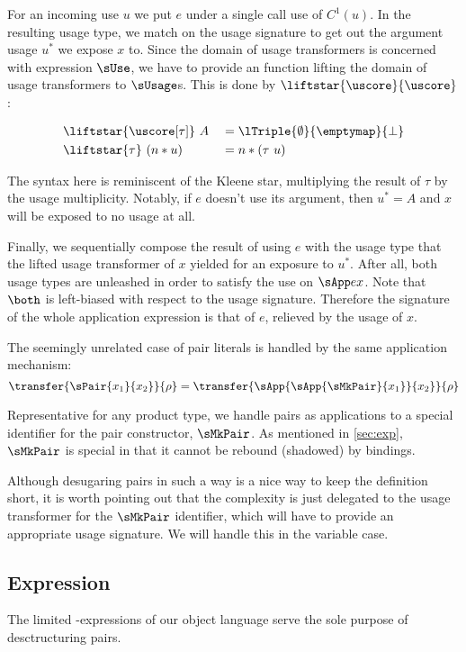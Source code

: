 For an incoming use $u$ we put $e$ under a single call use of $C^1(u)$. 
In the resulting usage type, we match on the usage signature to get out the argument usage $u^*$ we expose $x$ to.
Since the domain of usage transformers is concerned with expression $\sUse$, we have to provide an function lifting the domain of usage transformers to $\sUsage$s.
This is done by $\liftstar{\uscore}{\uscore}$:

\begin{alignat*}{2}
&\liftstar{\uscore[\tau]}~A &{}={}& \lTriple{\emptyset}{\emptymap}{\bot} \\
&\liftstar{\tau}~(n*u)      &{}={}& n*(\tau~u)
\end{alignat*}

The syntax here is reminiscent of the Kleene star, multiplying the result of $\tau$ by the usage multiplicity. Notably, if $e$ doesn't use its argument, then $u^*=A$ and $x$ will be exposed to no usage at all.

Finally, we sequentially compose the result of using $e$ with the usage type that the lifted usage transformer of $x$ yielded for an exposure to $u^*$. 
After all, both usage types are unleashed in order to satisfy the use on $\sApp e x$.
Note that $\both$ is left-biased with respect to the usage signature.
Therefore the signature of the whole application expression is that of $e$, relieved by the usage of $x$. 

The seemingly unrelated case of pair literals is handled by the same application mechanism:
\[
\transfer{\sPair{x_1}{x_2}}{\rho} = \transfer{\sApp{\sApp{\sMkPair}{x_1}}{x_2}}{\rho}
\]

Representative for any product type, we handle pairs as applications to a special identifier for the pair constructor, $\sMkPair$.
As mentioned in \cref{sec:exp}, $\sMkPair$ is special in that it cannot be rebound (\eg shadowed) by  bindings.

Although desugaring pairs in such a way is a nice way to keep the definition short, it is worth pointing out that the complexity is just delegated to the usage transformer for the $\sMkPair$ identifier, which will have to provide an appropriate usage signature. 
We will handle this in the variable case.

\subsection{ Expression}

The limited -expressions of our object language serve the sole purpose of desctructuring pairs.

